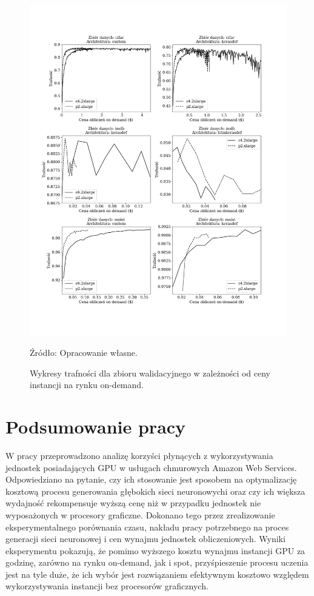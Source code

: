 \documentclass[12pt,a4paper,twoside]{article}
\newcommand{\source}[1]{\caption*{\hfill Źródło: {#1}} }
\begin{document}
\begin{figure}[h]
  \centering
\includegraphics[scale=0.5]{../obrazy/fig:experiment_acc_val_price_ond.png}
\caption{Wykresy trafności dla zbioru walidacyjnego w zależności od ceny instancji na rynku on-demand.\label{fig:experiment_acc_val_price_ond}}
\source{Opracowanie własne.}
\end{figure}

\clearpage

\section{Podsumowanie pracy}

\noindent
W pracy przeprowadzono analizę korzyści płynących z wykorzystywania jednostek posiadających GPU w usługach chmurowych Amazon Web Services. Odpowiedziano na pytanie, czy ich stosowanie jest sposobem na optymalizację kosztową procesu generowania głębokich sieci neuronowychi oraz czy ich większa wydajność rekompensuje wyższą cenę niż w przypadku jednostek nie wyposażonych w procesory graficzne. Dokonano tego przez zrealizowanie eksperymentalnego porównania czasu, nakładu pracy potrzebnego na proces generacji sieci neuronowej i cen wynajmu jednostek obliczeniowych. Wyniki eksperymentu pokazują, że pomimo wyższego kosztu wynajmu instancji GPU za godzinę, zarówno na rynku on-demand, jak i spot, przyśpieszenie procesu uczenia jest na tyle duże, że ich wybór jest rozwiązaniem efektywnym kosztowo względem wykorzystywania instancji bez procesorów graficznych.
\end{document}
